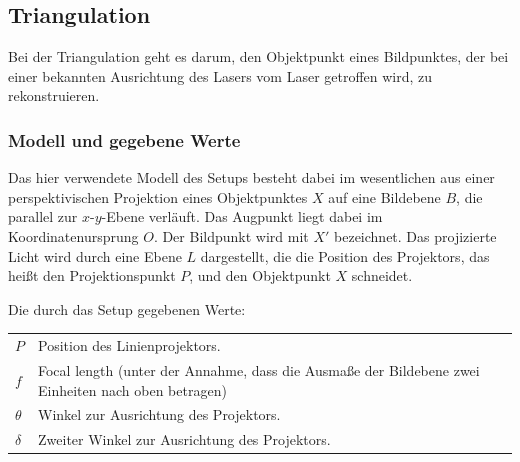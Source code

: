 \documentclass[ngerman,a4paper,parskip=half]{scrartcl}
\def \R{\mathbb{R}}
\def \fov{\mathrm{fov}}
\begin{document}



\subsection{Triangulation}

Bei der Triangulation geht es darum, den Objektpunkt eines Bildpunktes, der bei einer bekannten Ausrichtung des Lasers vom Laser getroffen wird, zu rekonstruieren.

\subsubsection{Modell und gegebene Werte}

Das hier verwendete Modell des Setups besteht dabei im wesentlichen aus einer perspektivischen Projektion eines Objektpunktes $X$ auf eine Bildebene $B$, die parallel zur $x$-$y$-Ebene verläuft. Das Augpunkt liegt dabei im Koordinatenursprung $O$. Der Bildpunkt wird mit $X'$ bezeichnet. Das projizierte Licht wird durch eine Ebene $L$ dargestellt, die die Position des Projektors, das heißt den Projektionspunkt $P$, und den Objektpunkt $X$ schneidet.

Die durch das Setup gegebenen Werte:

\begin{tabular}{lp{12cm}}
	$P$       & Position des Linienprojektors.\\
	$f$       & Focal length (unter der Annahme, dass die Ausmaße der Bildebene zwei Einheiten nach oben betragen)\\
	$\theta$  & Winkel zur Ausrichtung des Projektors.\\
	$\delta$  & Zweiter Winkel zur Ausrichtung des Projektors.
\end{tabular}
\end{document}
